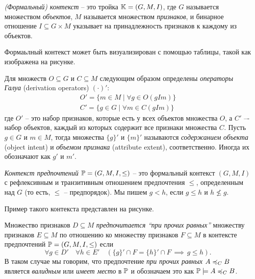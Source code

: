 		
		\begin{definition}
		\label{def:context}
			\emph{(Формальный) контекст} – это тройка $\mathbb{K} = (G, M, I)$, где $G$ называется множеством \emph{объектов}, $M$ называется множеством \emph{признаков}, и бинарное отношение ${I \subseteq G \times M}$ указывает на принадлежность признаков к каждому из объектов.
		\end{definition}
		
		Формаьлный контекст может быть визуализирован с помощью таблицы, такой как изображена на рисунке.
		
		Для множеств $O \subseteq G$ и $C \subseteq M$ следующим образом определены \emph{операторы Галуа} (derivation operators) $(\cdot)'$:
		\begin{subequations}
			\begin{gather}
			\label{eq:object_intent}
			O'=\{m \in M \mid \forall g \in O (g I m)\}  \\ 
			\label{eq:attribute_extent}
			C'=\{g \in G \mid \forall m \in C (g I m)\}
			\end{gather}
		\end{subequations}
		где $O'$ – это набор признаков, которые есть у всех объектов множества $O$, а $C'$  –- набор объектов, каждый из которых содержит все признаки множества $C$. Пусть $g \in G$ и $m \in M$, тогда множества $\{g\}'$ и $\{m\}'$ называются \emph{содержанием объекта} (object intent) и \emph{объемом признака} (attribute extent), соответственно. Иногда их обозначают как $g'$ и $m'$.
		
		\begin{definition}
		\label{def:preference_context}
			\emph{Контекст предпочтений} $\mathbb{P} = (G, M, I, \leq)$ – это формальный контекст $(G, M, I)$ с рефлексивным и транзитивным отношением предпочтения $\leq$, определенным над $G$ (то есть, $\leq$ – предпорядок). Мы пишем $g < h$, если $g \leq h$ и $h \not\leq g$.
		\end{definition}
		\noindent Пример такого контекста представлен на рисунке.
		
		\begin{definition}
		\label{def:ceteris_paribus}
			Множество признаков $D \subseteq M$ \emph{предпочитается \enquote{при прочих равных}} множеству признаков $E \subseteq M$ по отношению ко множеству признаков $F \subseteq M$ в контексте предпочтений $\mathbb{P} = (G, M, I, \leq)$ если 
			\begin{equation}
			\forall g \in D' \quad \forall h \in E' \quad (\{g\}' \cap F = \{h\}' \cap F \, \implies \, g \leq h).
			\end{equation}
			В таком случае мы говорим, что предпочтение \emph{при прочих равных} $A \preccurlyeq_{C} B$ является \emph{валидным} или \emph{имеет место} в $\mathbb{P}$ и обозначаем это как $\mathbb{P} \models A \preccurlyeq_{C} B$.
		\end{definition}
	
